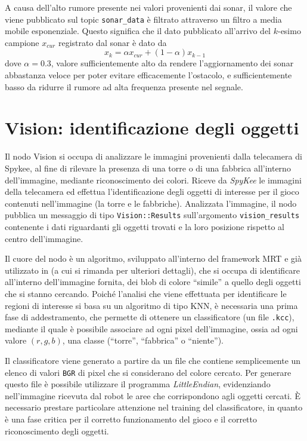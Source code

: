 A causa dell'alto rumore presente nei valori provenienti dai sonar, il valore che viene pubblicato sul topic \verb|sonar_data| è filtrato attraverso un filtro a media mobile esponenziale. Questo significa che il dato pubblicato all'arrivo del $k$-esimo campione $x_{cur}$ registrato dal sonar è dato da %
  \[ x_k = \alpha x_{cur} + (1 - \alpha) x_{k-1} \]
dove $\alpha = 0.3$, valore sufficientemente alto da rendere l'aggiornamento dei sonar abbastanza veloce per poter evitare efficacemente l'ostacolo, e sufficientemente basso da ridurre il rumore ad alta frequenza presente nel segnale.

\section{Vision: identificazione degli oggetti}

Il nodo Vision si occupa di analizzare le immagini provenienti dalla telecamera di Spykee, al fine di rilevare la presenza di una torre o di una fabbrica all'interno dell'immagine, mediante riconoscimento dei colori. Riceve da \emph{SpyKee} le immagini della telecamera ed effettua l'identificazione degli oggetti di interesse per il gioco contenuti nell'immagine (la torre e le fabbriche). Analizzata l'immagine, il nodo pubblica un messaggio di tipo \verb|Vision::Results| sull'argomento \verb|vision_results| contenente i dati riguardanti gli oggetti trovati e la loro posizione rispetto al centro dell'immagine. %

Il cuore del nodo è un algoritmo, sviluppato all'interno del framework MRT \cite{mrt} e già utilizzato in \cite{docmandelli} (a cui si rimanda per ulteriori dettagli), che si occupa di identificare all'interno dell'immagine fornita, dei blob di colore ``simile'' a quello degli oggetti che si stanno cercando. Poiché l'analisi che viene effettuata per identificare le regioni di interesse si basa su un algoritmo di tipo KNN, è necessaria una prima fase di addestramento, che permette di ottenere un classificatore (un file \verb|.kcc|), mediante il quale è possibile associare ad ogni pixel dell'immagine, ossia ad ogni valore $(r,g,b)$, una classe (``torre'', ``fabbrica'' o ``niente'').

Il classificatore viene generato a partire da un file che contiene semplicemente un elenco di valori \verb|BGR| di pixel che si considerano del colore cercato. Per generare questo file è possibile utilizzare il programma \emph{LittleEndian}, evidenziando nell'immagine ricevuta dal robot le aree che corrispondono agli oggetti cercati. È necessario prestare particolare attenzione nel training del classificatore, in quanto è una fase critica per il corretto funzionamento del gioco e il corretto riconoscimento degli oggetti. %

